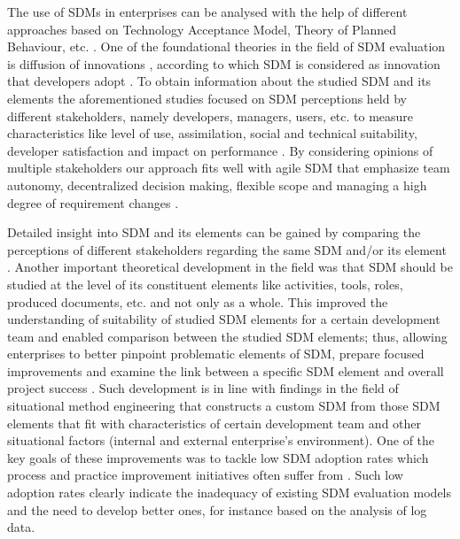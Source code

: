 The use of SDMs in enterprises can be analysed with the help of different approaches based on Technology Acceptance Model, Theory of Planned Behaviour, etc. \citep{aboelmaged2010predicting,venkatesh2000theoretical,DBLP:journals/behaviourIT/WangLH13}. One of the foundational theories in the field of SDM evaluation is diffusion of innovations \citep{DBLP:books/daglib/0012785}, according to which SDM is considered as innovation that developers adopt \citep{DBLP:journals/iam/Gallivan03,DBLP:journals/infsof/GreenHC05,Huisman2002}. To obtain information about the studied SDM and its elements the aforementioned studies focused on SDM perceptions held by different stakeholders, namely developers, managers, users, etc. to measure characteristics like level of use, assimilation, social and technical suitability, developer satisfaction and impact on performance \citep{atkinson1999project,cooper1990information,DBLP:books/daglib/0012785,DBLP:journals/infsof/VavpoticB09,DBLP:journals/comsis/VavpoticH12,DBLP:journals/infsof/HodaNM11}. By considering opinions of multiple
stakeholders our approach fits well with agile SDM that emphasize team autonomy, decentralized
decision making, flexible scope and managing a high degree of requirement changes \citep{DBLP:journals/smr/ScottMKP21,DBLP:journals/software/Jorgensen19}.


Detailed insight into SDM and its elements can be gained by comparing the perceptions of different stakeholders regarding the same SDM and/or its element \citep{hovelja2015exploring}. 
Another important theoretical development in the field was that SDM should be studied at the level of its constituent elements like activities, tools, roles, produced documents, etc. and not only as a whole. This improved the understanding of suitability of studied SDM elements for a certain development team and enabled comparison between the studied SDM elements; thus, allowing enterprises to better pinpoint problematic elements of SDM, prepare focused improvements and examine the link between a specific SDM element and overall project success \citep{atkinson1999project,hovelja2015exploring}. Such development is in line with findings in the field of situational method engineering \citep{DBLP:journals/ejis/KarlssonA09,DBLP:conf/caise/RalyteDR03,gill2018scaling,Malinova2022} that constructs a custom SDM from those SDM elements that fit with characteristics of certain development team and other situational factors (internal and external enterprise’s environment).
One of the key goals of these improvements was to tackle low SDM
adoption rates which process and practice improvement initiatives often suffer from \citep{DBLP:conf/profes/FontdevilaGOP19}. Such low adoption rates clearly indicate the inadequacy of existing SDM evaluation models and the need to develop better ones, for instance based on the analysis of log data.

